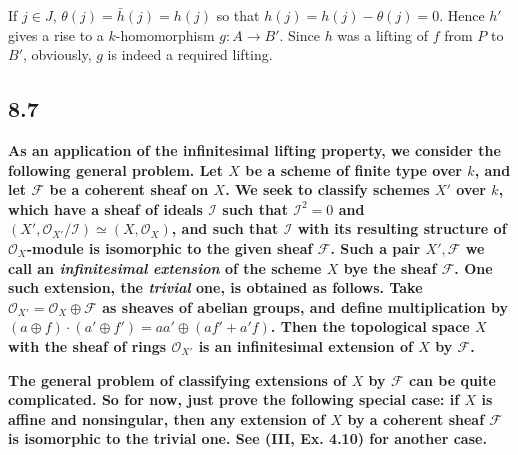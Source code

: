 \documentclass[11pt]{amsart}          %
\newcommand{\calO}{\mathcal{O}}
\newcommand{\calI}{\mathcal{I}}
\newcommand{\calF}{\mathcal{F}}
\begin{document}
If $j \in J$, $\theta(j) = \bar{h}(j) = h(j)$ so that $h(j) = h(j) - \theta(j) = 0$. Hence $h'$ gives a rise to a $k$-homomorphism $g: A \to B'$. Since $h$ was a lifting of $f$ from $P$ to $B'$, obviously, $g$ is indeed a required lifting. 

\subsection*{8.7}\textbf{As an application of the infinitesimal lifting property, we consider the following general problem. Let $X$ be a scheme of finite type over $k$, and let $\calF$ be a coherent sheaf on $X$. We seek to classify schemes $X'$ over $k$, which have a sheaf of ideals $\calI$ such that $\calI^2 = 0$ and $(X', \calO_{X'}/ \calI ) \simeq (X, \calO_X)$, and such that $\calI$ with its resulting structure of $\calO_X$-module is isomorphic to the given sheaf $\calF$. Such a pair $X', \calF$ we call an \emph{infinitesimal extension} of the scheme $X$ bye the sheaf $\calF$. One such extension, the \emph{trivial} one, is obtained as follows. Take $\calO_{X'} = \calO_X \oplus \calF$ as sheaves of abelian groups, and define multiplication by $(a \oplus f) \cdot (a' \oplus f') = aa' \oplus (af' + a'f)$. Then the topological space $X$ with the sheaf of rings $\calO_{X'}$ is an infinitesimal extension of $X$ by $\calF$.}

\textbf{The general problem of classifying extensions of $X$ by $\calF$ can be quite complicated. So for now, just prove the following special case: if $X$ is affine and nonsingular, then any extension of $X$ by a coherent sheaf $\calF$ is isomorphic to the trivial one. See (III, Ex. 4.10) for another case.}
\end{document}
